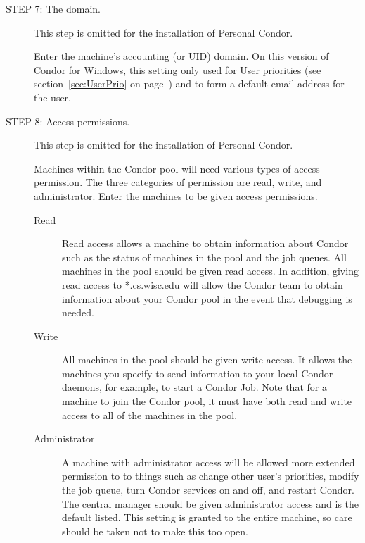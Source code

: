 \begin{description}
\item[STEP 7: The domain.]

     This step is omitted for the installation of Personal Condor.

     Enter the machine's accounting (or UID) domain.
	 On this version of Condor for Windows, this setting only used for User
	 priorities (see section~\ref{sec:UserPrio} on
	 page~\pageref{sec:UserPrio}) and to form a default email address for
	 the user.

\item[STEP 8: Access permissions.]
     This step is omitted for the installation of Personal Condor.

     Machines within the Condor pool will need
     various types of access permission. 
     The three categories of permission are read, write,
     and administrator. Enter the machines to be given
     access permissions.

     \begin{description}
     \item[Read]
     Read access allows a machine to obtain information about
     Condor such as the status of machines in the pool and the
     job queues.
     All machines in the pool should be given read access. 
     In addition, giving read access to *.cs.wisc.edu 
     will allow the Condor team to obtain information about
     your Condor pool in the event that debugging is needed.
     \item[Write]
     All machines in the pool should be given write access. 
     It allows the machines you specify to send information to your
	 local Condor daemons, for example, to start a Condor Job.
     Note that for a machine to join the Condor pool, it must have both read and write access to all of the machines in the pool.
     \item[Administrator]
     A machine with administrator access will be allowed more
     extended permission to to things such as
     change other user's priorities, modify the job queue,
     turn Condor services on and off,
     and restart Condor.
     The central manager should be given administrator access
     and is the default listed.
	 This setting is granted to the entire machine, so care should be taken not to make this too open.
     \end{description}


\end{description}

